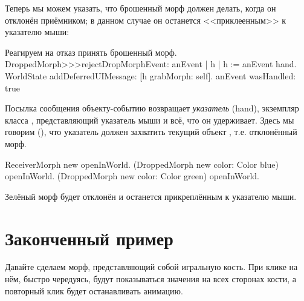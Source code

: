 \documentclass[a4paper,10pt,twoside]{book}
\begin{document}
Теперь мы можем указать, что брошенный морф должен делать, когда он отклонён приёмником; в данном случае он останется <<приклеенным>> к указателю мыши:
\begin{method}{Реагируем на отказ принять брошенный морф.}
DroppedMorph>>>rejectDropMorphEvent: anEvent
	| h |
	h := anEvent hand.
	WorldState
		addDeferredUIMessage: [h grabMorph: self].
	anEvent wasHandled: true
\end{method}

Посылка сообщения  объекту-событию возвращает \emph{указатель} (hand), экземпляр класса , представляющий указатель мыши и всё, что он удерживает.
Здесь мы говорим  (), что указатель должен захватить текущий объект , т.е. отклонённый морф.

\begin{code}{}
ReceiverMorph new openInWorld.
(DroppedMorph new color: Color blue) openInWorld.
(DroppedMorph new color: Color green) openInWorld.
\end{code}
\noindent
Зелёный морф будет отклонён и останется прикреплённым к указателю мыши.

\section{Законченный пример}

Давайте сделаем морф, представляющий собой игральную кость. При клике на нём, быстро чередуясь, будут показываться значения на всех сторонах кости, а повторный клик будет останавливать анимацию.
\end{document}
